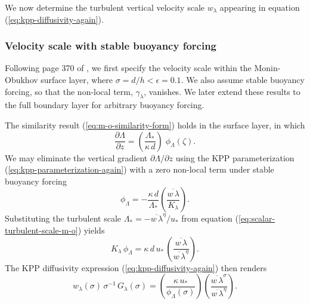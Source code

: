 We now determine the turbulent vertical velocity scale $w_{\lambda}$
appearing in equation (\ref{eq:kpp-diffusivity-again}). 


\subsubsection{Velocity scale with stable buoyancy forcing}

Following page 370 of \cite{LargeKPP}, we first specify the velocity
scale within the Monin-Obukhov surface layer, where $\sigma = d/h <
\epsilon = 0.1$.  We also assume stable buoyancy forcing, so that the
non-local term, $\gamma_{\lambda}$, vanishes.  We later extend these
results to the full boundary layer for arbitrary buoyancy forcing.

The similarity result (\ref{eq:m-o-similarity-form}) holds in the
surface layer, in which
\begin{equation}
  \frac{\partial \Lambda}{\partial z} = \left( \frac{\Lambda_{*}}{\kappa \, d} \right) \; \phi_{\Lambda}(\zeta).
\label{eq:m-o-similarity-form-again}
\end{equation}
We may eliminate the vertical gradient $\partial \Lambda/ \partial z$
using the KPP parameterization (\ref{eq:kpp-parameterization-again})
with a zero non-local term under stable buoyancy forcing
\begin{equation}
 \phi_{\Lambda} = -\frac{\kappa \, d}{\Lambda_{*}} \left( \frac{\overline{w \, \lambda}}{K_{\lambda}} \right).
\end{equation}
Substituting the turbulent scale $\Lambda_{*} =-\overline{w \,
  \lambda}^{\eta}/ u_{*}$ from equation
(\ref{eq:scalar-turbulent-scale-m-o}) yields
\begin{equation}
 K_{\lambda} \, \phi_{\Lambda} = \kappa \, d \, u_{*} \, \left( \frac{\overline{w \, \lambda}} {\overline{w \, \lambda}^{\eta} } \right).
\end{equation}
The KPP diffusivity expression (\ref{eq:kpp-diffusivity-again}) then
renders
\begin{equation}
 w_{\lambda}(\sigma) \, \sigma^{-1} \, G_{\lambda}(\sigma) = 
 \left(  \frac{\kappa \, u_{*}}{\phi_{\Lambda}(\sigma) }  \right) 
 \left( \frac{ \overline{w \, \lambda}^{\sigma}}{ \overline{w \, \lambda}^{\eta}}\right).
\end{equation}

